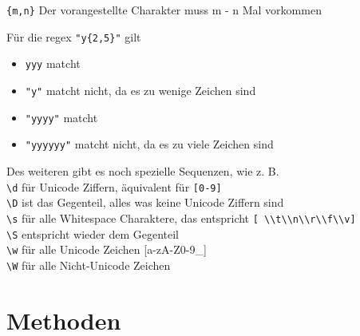 \documentclass[ignorenonframetext,]{beamer}
\providecommand{\tightlist}{%
  \setlength{\itemsep}{0pt}\setlength{\parskip}{0pt}}
\begin{document}
\begin{frame}

\texttt{\{m,n\}} Der vorangestellte Charakter muss m - n Mal vorkommen

Für die regex \texttt{"y\{2,5\}"} gilt

\begin{itemize}
\tightlist
\item
  \texttt{yyy} matcht
\item
  \texttt{"y"} matcht nicht, da es zu wenige Zeichen sind
\item
  \texttt{"yyyy"} matcht
\item
  \texttt{"yyyyyy"} matcht nicht, da es zu viele Zeichen sind
\end{itemize}

\end{frame}

\begin{frame}

Des weiteren gibt es noch spezielle Sequenzen, wie z. B.\\
\texttt{\textbackslash{}d} für Unicode Ziffern, äquivalent für
\texttt{{[}0-9{]}}\\
\texttt{\textbackslash{}D} ist das Gegenteil, alles was keine Unicode
Ziffern sind\\
\texttt{\textbackslash{}s} für alle Whitespace Charaktere, das
entspricht
\texttt{{[}\ \textbackslash{}\textbackslash{}t\textbackslash{}\textbackslash{}n\textbackslash{}\textbackslash{}r\textbackslash{}\textbackslash{}f\textbackslash{}\textbackslash{}v{]}}\\
\texttt{\textbackslash{}S} entspricht wieder dem Gegenteil\\
\texttt{\textbackslash{}w} für alle Unicode Zeichen {[}a-zA-Z0-9\_{]}\\
\texttt{\textbackslash{}W} für alle Nicht-Unicode Zeichen

\end{frame}

\section{Methoden}\label{methoden}
\end{document}
